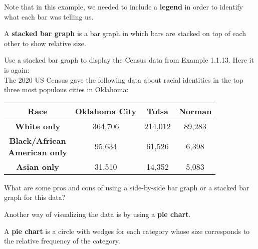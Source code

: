 \documentclass[notes]{subfiles}
\begin{document}
		Note that in this example, we needed to include a \textbf{legend} in order to identify what each bar was telling us.

		\begin{defn}
			A \textbf{stacked bar graph} is a bar graph in which bars are stacked on top of each other to show relative size.
		\end{defn}

			\newpage

		\begin{ex}
			Use a stacked bar graph to display the Census data from Example 1.1.13.  Here it is again:\\[10pt]

			The 2020 US Census gave the following data about racial identities in the top three most populous cities in Oklahoma:
			\begin{center}
				{
				\renewcommand{\arraystretch}{1.5}
				\begin{tabular}{|c|c|c|c|}\hline
					\textbf{Race} & \textbf{Oklahoma City} & \textbf{Tulsa} & \textbf{Norman}\\ \hline
					\textbf{White only} & 364,706 & 214,012 & 89,283 \\ \hline
					\makecell{\textbf{Black/African}\\ \textbf{American only}} & 95,634 & 61,526 & 6,398 \\ \hline
					\textbf{Asian only} & 31,510 & 14,352 & 5,083\\ \hline
				\end{tabular}
				}
			\end{center}
		\end{ex}

		\begin{question}
			What are some pros and cons of using a side-by-side bar graph or a stacked bar graph for this data?
		\end{question}
		
		Another way of visualizing the data is by using a \textbf{pie chart}.
			\newpage

		\begin{defn}
			A \textbf{pie chart} is a circle with wedges for each category whose size corresponds to the relative frequency of the category.
		\end{defn}
\end{document}
